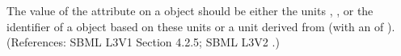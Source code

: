 The value of the attribute  on a \Model object should be
either the units , , or the identifier of a
\UnitDefinition object based on these units or a unit derived from
 (with an  of ).  (References: SBML L3V1 Section 4.2.5; SBML L3V2
.)
